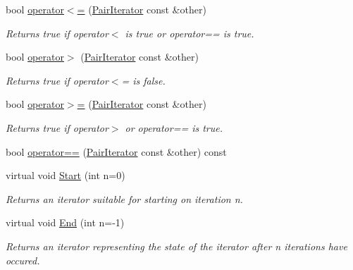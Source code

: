 \begin{DoxyCompactItemize}
\item 
bool \hyperlink{classJKBuilder_1_1PairIterator_a9c95b8dd7929cb34336a944ce96e88a7}{operator$<$=} (\hyperlink{classJKBuilder_1_1PairIterator}{PairIterator} const \&other)
\begin{DoxyCompactList}\small\item\em Returns true if operator$<$ is true or operator== is true. \item\end{DoxyCompactList}\item 
bool \hyperlink{classJKBuilder_1_1PairIterator_ab37a738406950a5e19931f4c09b41f29}{operator$>$} (\hyperlink{classJKBuilder_1_1PairIterator}{PairIterator} const \&other)
\begin{DoxyCompactList}\small\item\em Returns true if operator$<$= is false. \item\end{DoxyCompactList}\item 
bool \hyperlink{classJKBuilder_1_1PairIterator_a0064337d38b8f97d0367be2e9bd31d62}{operator$>$=} (\hyperlink{classJKBuilder_1_1PairIterator}{PairIterator} const \&other)
\begin{DoxyCompactList}\small\item\em Returns true if operator$>$ or operator== is true. \item\end{DoxyCompactList}\item 
bool \hyperlink{classJKBuilder_1_1PairIterator_a6b4e430066f478e5e400edd39ef93968}{operator==} (\hyperlink{classJKBuilder_1_1PairIterator}{PairIterator} const \&other) const 
\item 
virtual void \hyperlink{classJKBuilder_1_1Iterator_a34ca36a99b20ae3170babadaffe51ed2}{Start} (int n=0)
\begin{DoxyCompactList}\small\item\em Returns an iterator suitable for starting on iteration n. \item\end{DoxyCompactList}\item 
virtual void \hyperlink{classJKBuilder_1_1Iterator_a5f692b73d2e160450f4617bb75825e11}{End} (int n=-\/1)
\begin{DoxyCompactList}\small\item\em Returns an iterator representing the state of the iterator after n iterations have occured. \item\end{DoxyCompactList}\item 

\end{DoxyCompactItemize}
